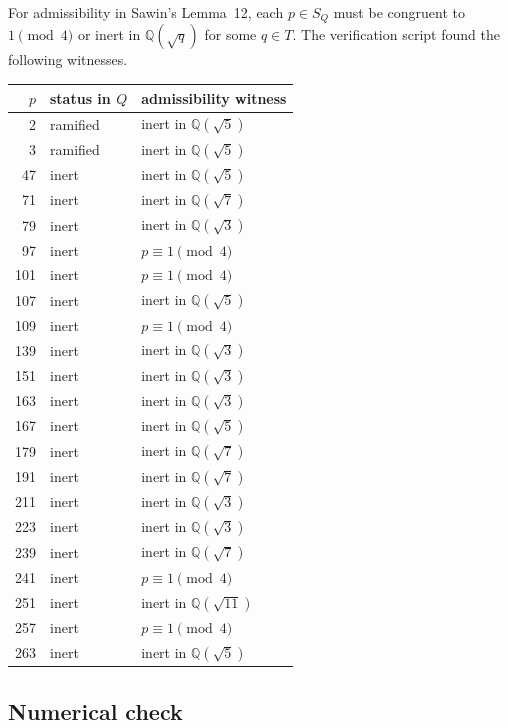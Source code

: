 \documentclass[a4paper,12pt]{article}
\begin{document}
For admissibility in Sawin's Lemma~12, each $p\in S_Q$ must be congruent to $1\pmod 4$ or inert in $\mathbb{Q}(\sqrt q)$ for some $q\in T$.  The verification script found the following witnesses.

\begin{center}
\scriptsize
\begin{tabular}{rll}
\toprule
$p$ & status in $Q$ & admissibility witness \\
\midrule
2   & ramified & inert in $\mathbb{Q}(\sqrt5)$ \\
3   & ramified & inert in $\mathbb{Q}(\sqrt5)$ \\
47  & inert & inert in $\mathbb{Q}(\sqrt5)$ \\
71  & inert & inert in $\mathbb{Q}(\sqrt7)$ \\
79  & inert & inert in $\mathbb{Q}(\sqrt3)$ \\
97  & inert & $p\equiv1\pmod4$ \\
101 & inert & $p\equiv1\pmod4$ \\
107 & inert & inert in $\mathbb{Q}(\sqrt5)$ \\
109 & inert & $p\equiv1\pmod4$ \\
139 & inert & inert in $\mathbb{Q}(\sqrt3)$ \\
151 & inert & inert in $\mathbb{Q}(\sqrt3)$ \\
163 & inert & inert in $\mathbb{Q}(\sqrt3)$ \\
167 & inert & inert in $\mathbb{Q}(\sqrt5)$ \\
179 & inert & inert in $\mathbb{Q}(\sqrt7)$ \\
191 & inert & inert in $\mathbb{Q}(\sqrt7)$ \\
211 & inert & inert in $\mathbb{Q}(\sqrt3)$ \\
223 & inert & inert in $\mathbb{Q}(\sqrt3)$ \\
239 & inert & inert in $\mathbb{Q}(\sqrt7)$ \\
241 & inert & $p\equiv1\pmod4$ \\
251 & inert & inert in $\mathbb{Q}(\sqrt{11})$ \\
257 & inert & $p\equiv1\pmod4$ \\
263 & inert & inert in $\mathbb{Q}(\sqrt5)$ \\
\bottomrule
\end{tabular}
\end{center}

\subsection*{Numerical check}
\end{document}
